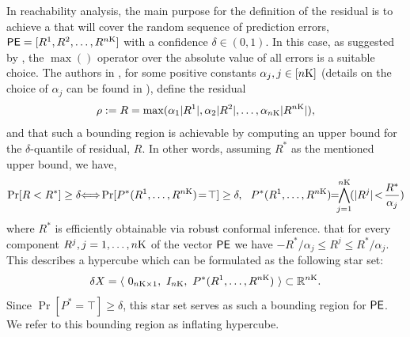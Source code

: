  In reachability analysis, the main purpose for the definition of the residual is to achieve a  that will cover the random sequence of prediction errors, $\mathsf{PE} = [R^1, R^2, \ldots, R^{n\mathrm{K}}]$ with a  confidence $\delta\in (0,1)$. In this case, as suggested by \cite{cleaveland2023conformal}, the $\max()$ operator over the absolute value of all errors is a suitable choice. The authors in \cite{hashemi2024statistical}, for some positive constants $\alpha_j, j\in[n\mathrm{K}]$ (details on the choice of $\alpha_j$ can  be found in \cite{hashemi2024statistical}), define   the residual
\begin{equation}\label{eq:Rmax}
\rho:= R = \max( \alpha_1 |R^1|, \alpha_2 |R^2|, \ldots, \alpha_{n\mathrm{K}}|R^{n\mathrm{K}}|),
\end{equation}
and  that such a bounding region is achievable by computing an upper bound for the $\delta$-quantile of residual, $R$. In other words, assuming $R^*$ as the mentioned upper bound, we have,
\begin{equation}\label{eq:Pstar}
\Pr[R<R^*] \geq \delta \!\! \navid{\iff} \!\!\Pr[P^*(R^1,\ldots,R^{n\horizon})\! = \!\top] \geq \delta,\ \   P^*(R^1,\ldots,R^{n\horizon})\!\! = \!\!\! \bigwedge_{j=1}^{n\horizon}\! (|R^j| \! < \! \frac{R^*}{\alpha_j})
\end{equation}
where $R^*$ is efficiently obtainable via robust conformal inference.  that for every component $R^j, j=1,\ldots,n\mathrm{K}$ of the vector $\mathsf{PE}$ we have $-R^*/\alpha_j\leq R^j \leq R^*/\alpha_j$. This describes a hypercube which can be formulated as the following star set:
\begin{equation}
\delta X = \langle\  0_{n\mathrm{K} \times 1},\  I_{n\mathrm{K}},\  P^*(R^1,\ldots,R^{n\mathrm{K}}) \ \rangle \subset \mathbb{R}^{n\mathrm{K}}.
\end{equation}
Since $\Pr[P^* = \top] \geq \delta$, this star set serves as such a bounding region for $\mathsf{PE}$. We refer to this bounding region as inflating hypercube.


